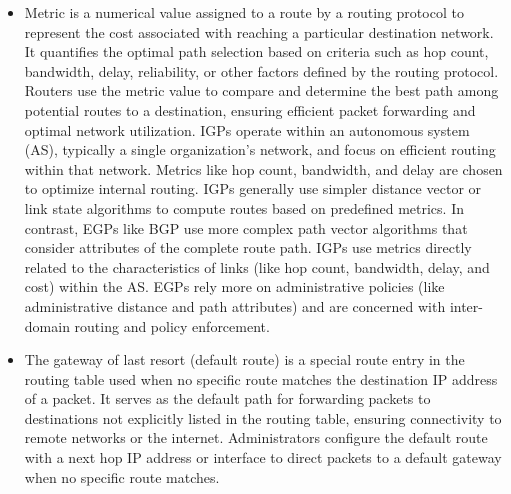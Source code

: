 \documentclass{article}
\begin{document}
\begin{itemize}
	\item[] Metric is a numerical value assigned to a route by a routing protocol to represent the cost associated with reaching a particular destination network. It quantifies the optimal path selection based on criteria such as hop count, bandwidth, delay, reliability, or other factors defined by the routing protocol. Routers use the metric value to compare and determine the best path among potential routes to a destination, ensuring efficient packet forwarding and optimal network utilization. IGPs operate within an autonomous system (AS), typically a single organization's network, and focus on efficient routing within that network. Metrics like hop count, bandwidth, and delay are chosen to optimize internal routing. IGPs generally use simpler distance vector or link state algorithms to compute routes based on predefined metrics. In contrast, EGPs like BGP use more complex path vector algorithms that consider attributes of the complete route path. IGPs use metrics directly related to the characteristics of links (like hop count, bandwidth, delay, and cost) within the AS. EGPs rely more on administrative policies (like administrative distance and path attributes) and are concerned with inter-domain routing and policy enforcement.
	\item[] The gateway of last resort (default route) is a special route entry in the routing table used when no specific route matches the destination IP address of a packet. It serves as the default path for forwarding packets to destinations not explicitly listed in the routing table, ensuring connectivity to remote networks or the internet. Administrators configure the default route with a next hop IP address or interface to direct packets to a default gateway when no specific route matches.
  

\end{itemize}
\end{document}
